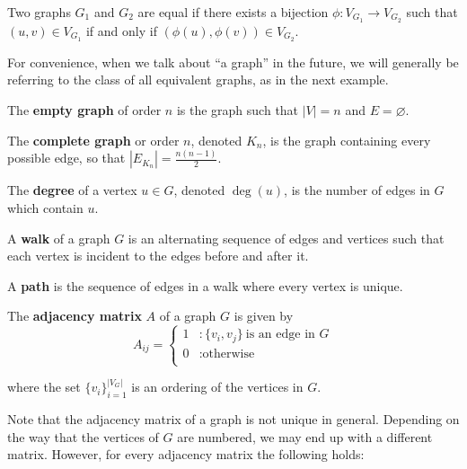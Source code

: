 \begin{definition}
  Two graphs $G_1$ and $G_2$ are equal if there exists a bijection
  $\phi : V_{G_1} \to V_{G_2}$ such that
  $(u,v) \in V_{G_1}$ if and only if $(\phi(u),\phi(v)) \in V_{G_2}$.
\end{definition}

For convenience, when we talk about ``a graph'' in the future, we will generally
be referring to the class of all equivalent graphs, as in the next example.

\begin{example}
  The \textbf{empty graph} of order $n$ is the graph such that $|V| = n$ and $E
  = \varnothing$.

  The \textbf{complete graph} or order $n$, denoted $K_n$, is the graph
  containing every possible edge, so that $|E_{K_n}| = \frac{n(n-1)}{2}$.
\end{example}

\begin{definition}
  The \textbf{degree} of a vertex $u \in G$, denoted $\deg (u)$, is the number
  of edges in $G$ which contain $u$.
\end{definition}

\begin{definition}
  A \textbf{walk} of a graph $G$ is an alternating sequence of edges and
  vertices such that each vertex is incident to the edges before and after it.

  A \textbf{path} is the sequence of edges in a walk where every vertex is
  unique.
\end{definition}

\begin{definition}
  The \textbf{adjacency matrix} $A$ of a graph $G$ is given by
  \[
    A_{ij} = \begin{cases}
      1 &: \{v_i,v_j\} ~\text{is an edge in $G$} \\
      0 &: \text{otherwise} \\
    \end{cases}
  \]

  where the set $\{v_i\}_{i=1}^{|V_G|}$ is an ordering of the vertices in $G$.
\end{definition}


Note that the adjacency matrix of a graph is not unique in general. Depending on
the way that the vertices of $G$ are numbered, we may end up with a different
matrix. However, for every adjacency matrix the following holds:


